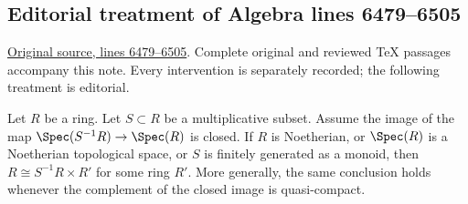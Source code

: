 \subsection{Editorial treatment of Algebra lines 6479--6505}

\hypertarget{algebra-context-053}{}

\noindent\href{https://github.com/stacks/stacks-project/blob/a04446e57ec1fbc252a871afcec7752fb2807b14/algebra.tex\#L6479}{Original source, lines 6479--6505}. Complete original and reviewed TeX passages accompany this note. Every intervention is separately recorded; the following treatment is editorial.


\begin{lemma}
\label{editorial-source-lemma-invert-closed-split}
Let $R$ be a ring. Let $S \subset R$ be a multiplicative subset.
Assume the image of the map $\Spec(S^{-1}R) \to \Spec(R)$
is closed. If $R$ is Noetherian, or $\Spec(R)$ is a
Noetherian topological space, or $S$ is finitely generated as a monoid,
then $R\cong S^{-1}R\times R'$ for some ring $R'$.
More generally, the same conclusion holds whenever the complement
of the closed image is quasi-compact.
\end{lemma}

